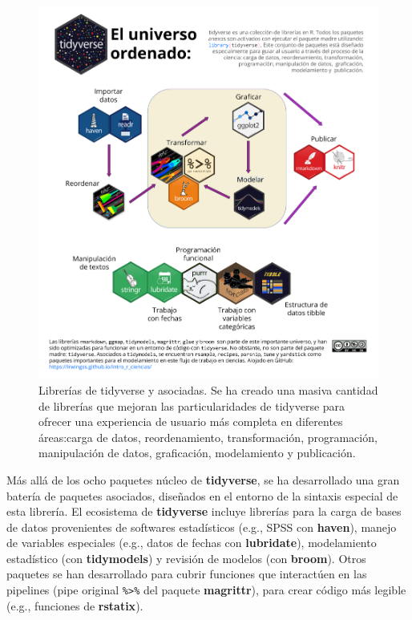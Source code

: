 \documentclass[
]{article}
\theoremstyle{definition}
\theoremstyle{definition}
\theoremstyle{definition}
\theoremstyle{definition}
\theoremstyle{remark}
\begin{document}
\begin{figure}

{\centering \includegraphics[width=1\linewidth]{figs/elaboradas/tidyverse universo} 

}

\caption{Librerías de tidyverse y asociadas. Se ha creado una masiva cantidad de librerías que mejoran las particularidades de tidyverse para ofrecer una experiencia de usuario más completa en diferentes áreas:carga de datos, reordenamiento, transformación, programación, manipulación de datos, graficación, modelamiento y publicación.}\label{fig:figura49}
\end{figure}

Más allá de los ocho paquetes núcleo de \textbf{tidyverse}, se ha desarrollado una gran batería de paquetes asociados, diseñados en el entorno de la sintaxis especial de esta librería. El ecosistema de \textbf{tidyverse} incluye librerías para la carga de bases de datos provenientes de softwares estadísticos (e.g., SPSS con \textbf{haven}), manejo de variables especiales (e.g., datos de fechas con \textbf{lubridate}), modelamiento estadístico (con \textbf{tidymodels}) y revisión de modelos (con \textbf{broom}). Otros paquetes se han desarrollado para cubrir funciones que interactúen en las pipelines (pipe original \texttt{\%\textgreater{}\%} del paquete \textbf{magrittr}), para crear código más legible (e.g., funciones de \textbf{rstatix}).
\end{document}
